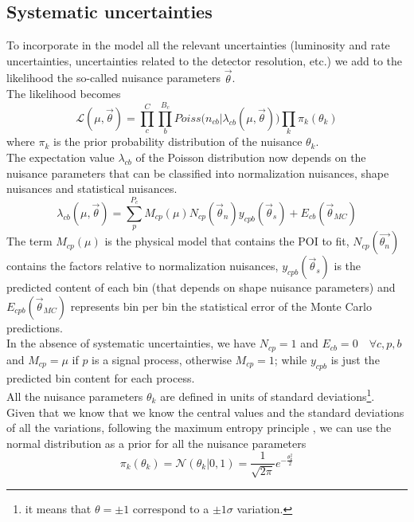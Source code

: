 \subsection{Systematic uncertainties}
To incorporate in the model all the relevant uncertainties (\ie luminosity and rate uncertainties, uncertainties related to the detector resolution, etc.) we add to the likelihood the so-called nuisance parameters $\vec{\theta}$.\\
The likelihood becomes \cite{Conway2011IncorporatingSpectra}
\begin{equation}\label{eq:likelihood}
    \mathcal{L}(\mu,\vec{\theta})=\prod_c^C \prod_b^{B_c} Poiss \big( n_{cb}| \lambda_{cb}(\mu,\vec{\theta}) \big)  \prod_k  \pi_{k}(\theta_k)
\end{equation}
where $\pi_{k}$ is the prior probability distribution of the nuisance $\theta_k$.\\
The expectation value $\lambda_{cb}$ of the Poisson distribution now depends on the nuisance parameters that can be classified into normalization nuisances, shape nuisances and statistical nuisances.
\begin{equation}\label{eq:lambda}
     \lambda_{cb}( \mu,\vec{\theta})=\sum_p^{P_c}M_{cp}(\mu) N_{cp}(\vec{\theta}_n)y_{cpb}(\vec{\theta}_s)+E_{cb}(\vec{\theta}_{MC})
\end{equation}
The term $M_{cp}(\mu)$ is the physical model that contains the POI to fit, $N_{cp}(\vec{\theta_n})$ contains the factors relative to normalization nuisances, $y_{cpb}(\vec{\theta}_s)$ is the predicted content of each bin (that depends on shape nuisance parameters) and $E_{cpb}(\vec{\theta}_{MC})$ represents bin per bin the statistical error of the Monte Carlo predictions.\\
In the absence of systematic uncertainties, we have $N_{cp}=1$ and $E_{cb}=0 \quad \forall c,p,b$ and
$M_{cp}=\mu$ if $p$ is a signal process, otherwise $M_{cp}=1$; while $y_{cpb}$ is just the predicted bin content for each process.\\
All the nuisance parameters $\theta_k$ are defined in units of standard deviations\footnote{it means that $\theta=\pm 1$ correspond to a $\pm 1 \sigma$ variation.}.\\
Given that we know that we know the central values and the standard deviations of all the variations, following the maximum entropy principle \ADDREF, we can use the normal distribution as a prior for all the nuisance parameters
\begin{equation}
    \pi_k(\theta_k)=\mathcal{N}\left(\theta_k|0,1\right)=\frac{1}{\sqrt{2\pi}}e^{-\frac{\theta_k^2}{2}}
\end{equation}
